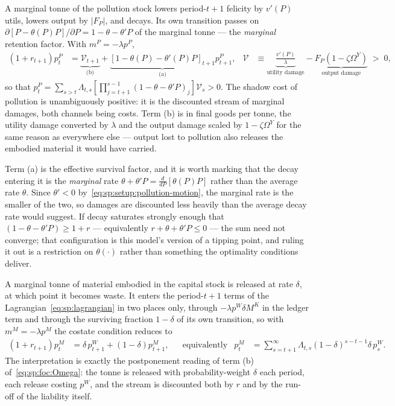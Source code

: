  A marginal tonne of the pollution stock lowers period-$t{+}1$ felicity by $v'\left(P\right)$ utils, lowers output by $\left|F_P\right|$, and decays. Its own transition passes on $\partial\left[P-\theta\left(P\right)P\right]/\partial P=1-\theta-\theta'P$ of the marginal tonne --- the \emph{marginal} retention factor. With $m^P=-\lambda p^P$,
\begin{align}
\left(1+r_{t+1}\right)p^P_t &= \underbrace{\mathcal V_{t+1}}_{\text{(b)}}+\underbrace{\left[1-\theta\left(P\right)-\theta'\left(P\right)P\right]_{t+1}}_{\text{(a)}}p^P_{t+1},
&
\mathcal V &\equiv \underbrace{\frac{v'\left(P\right)}{\lambda}}_{\text{utility damage}}-\underbrace{F_P\left(1-\zeta\Omega^Y\right)}_{\text{output damage}}\;>\;0,
\label{eq:sp:costate:P}
\end{align}
so that $p^P_t=\sum_{s>t}\Lambda_{t,s}\left[\prod_{j=t+1}^{s-1}\left(1-\theta-\theta'P\right)_j\right]\mathcal V_s>0$. The shadow cost of pollution is unambiguously positive: it is the discounted stream of marginal damages, both channels being costs. Term (b) is in final goods per tonne, the utility damage converted by $\lambda$ and the output damage scaled by $1-\zeta\Omega^Y$ for the same reason as everywhere else --- output lost to pollution also releases the embodied material it would have carried.

Term (a) is the effective survival factor, and it is worth marking that the decay entering it is the \emph{marginal} rate $\theta+\theta'P=\tfrac{d}{dP}\left[\theta\left(P\right)P\right]$ rather than the average rate $\theta$. Since $\theta'<0$ by~\eqref{eq:sp:setup:pollution-motion}, the marginal rate is the smaller of the two, so damages are discounted less heavily than the average decay rate would suggest. If decay saturates strongly enough that $\left(1-\theta-\theta'P\right)\ge1+r$ --- equivalently $r+\theta+\theta'P\le0$ --- the sum need not converge; that configuration is this model's version of a tipping point, and ruling it out is a restriction on $\theta\left(\cdot\right)$ rather than something the optimality conditions deliver.

 A marginal tonne of material embodied in the capital stock is released at rate $\delta$, at which point it becomes waste. It enters the period-$t{+}1$ terms of the Lagrangian~\eqref{eq:sp:lagrangian} in two places only, through $-\lambda p^W\delta M^K$ in the ledger term and through the surviving fraction $1-\delta$ of its own transition, so with $m^M=-\lambda p^M$ the costate condition reduces to
\begin{align}
\left(1+r_{t+1}\right)p^M_t &= \delta\,p^W_{t+1}+\left(1-\delta\right)p^M_{t+1},
&&\text{equivalently}
&
p^M_t &= \sum_{s=t+1}^\infty \Lambda_{t,s}\left(1-\delta\right)^{s-t-1}\delta\,p^W_s .
\label{eq:sp:costate:M}
\end{align}
The interpretation is exactly the postponement reading of term (b) of~\eqref{eq:sp:foc:Omega}: the tonne is released with probability-weight $\delta$ each period, each release costing $p^W$, and the stream is discounted both by $r$ and by the run-off of the liability itself.

